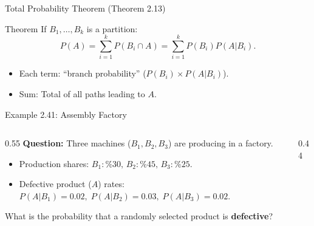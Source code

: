 \documentclass[light]{lutbeamer}
\begin{document}
\begin{frame}[fragile]{Total Probability Theorem (Theorem 2.13)}
    \begin{block}{Theorem}
        If \(B_1,\dots,B_k\) is a partition:
        \[
        P(A)=\sum_{i=1}^{k}P(B_i\cap A)=\sum_{i=1}^{k}P(B_i)P(A|B_i).
        \]
    \end{block}

    \begin{itemize}
        \item Each term: ``branch probability'' (\(P(B_i)\times P(A|B_i)\)).
        \item Sum: Total of all paths leading to \(A\).
    \end{itemize}
\end{frame}


\begin{frame}{Example 2.41: Assembly Factory}
    \small
    \begin{columns}[T]
        \begin{column}{0.55\textwidth}
            \textbf{Question:}
            Three machines ($B_1, B_2, B_3$) are producing in a factory.
            \begin{itemize}
                \item Production shares: $B_1: \%30, \, B_2: \%45, \, B_3: \%25$.
                \item Defective product ($A$) rates: $P(A|B_1)=0.02,\; P(A|B_2)=0.03,\; P(A|B_3)=0.02$.
            \end{itemize}
            What is the probability that a randomly selected product is \textbf{defective}?
            
        \end{column}
        \begin{column}{0.44\textwidth}


\end{column}
\end{columns}
\end{frame}
\end{document}
